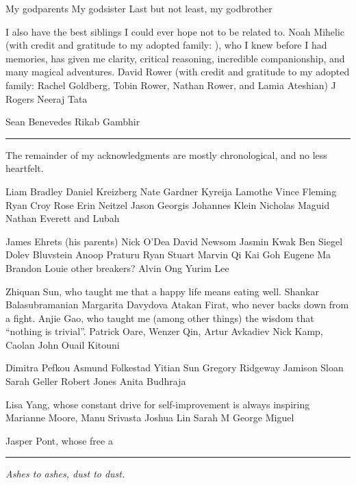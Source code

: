 My godparents
%
My godsister
%
Last but not least, my godbrother



I also have the best siblings I could ever hope not to be related to.
%
Noah Mihelic (with credit and gratitude to my adopted family: ), who I knew before I had memories, has given me clarity, critical reasoning, incredible companionship, and many magical adventures.
%
David Rower (with credit and gratitude to my adopted family: Rachel Goldberg, Tobin Rower, Nathan Rower, and Lamia Ateshian)
%
J Rogers
%
Neeraj Tata



Sean Benevedes
%
Rikab Gambhir



\vspace{10pt}
\hrule
\vspace{10pt}



The remainder of my acknowledgments are mostly chronological, and no less heartfelt.


Liam Bradley
%
Daniel Kreizberg
%
Nate Gardner
%
Kyreija Lamothe
%
Vince Fleming
%
Ryan Croy
%
Rose
%
Erin Neitzel
%
Jason Georgis
%
Johannes Klein
%
Nicholas Maguid
%
Nathan Everett and Lubah



James Ehrets
(his parents)
%
Nick O'Dea
%
David Newsom
%
Jasmin Kwak
%
Ben Siegel
%
Dolev Bluvstein
%
Anoop Praturu
%
Ryan Stuart
%
Marvin Qi
%
Kai Goh
%
Eugene Ma
%
Brandon Louie
%
other breakers?
%
Alvin Ong
%
Yurim Lee



Zhiquan Sun, who taught me that a happy life means eating well.
%
Shankar Balasubramanian
%
Margarita Davydova
%
Atakan Firat, who never backs down from a fight.
%
Anjie Gao, who taught me (among other things) the wisdom that ``nothing is trivial''.
%
Patrick Oare, Wenzer Qin, Artur Avkadiev
%
Nick Kamp, Caolan John
%
Ouail Kitouni

Dimitra Pefkou
%
Asmund Folkestad
%
Yitian Sun
%
Gregory Ridgeway
%
Jamison Sloan
%
Sarah Geller
%
Robert Jones
%
Anita Budhraja

Lisa Yang, whose constant drive for self-improvement is always inspiring
%
Marianne Moore, Manu Srivasta
%
Joshua Lin
%
Sarah M
%
George
%
Miguel


Jasper Pont, whose free a

\vspace{12pt}
\hrule

\begin{center}
    \textit{Ashes to ashes, dust to dust.}
\end{center}
